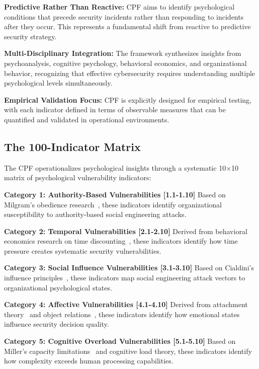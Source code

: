 \documentclass[11pt,a4paper]{article}
\begin{document}
\textbf{Predictive Rather Than Reactive:} CPF aims to identify psychological conditions that precede security incidents rather than responding to incidents after they occur. This represents a fundamental shift from reactive to predictive security strategy.

\textbf{Multi-Disciplinary Integration:} The framework synthesizes insights from psychoanalysis, cognitive psychology, behavioral economics, and organizational behavior, recognizing that effective cybersecurity requires understanding multiple psychological levels simultaneously.

\textbf{Empirical Validation Focus:} CPF is explicitly designed for empirical testing, with each indicator defined in terms of observable measures that can be quantified and validated in operational environments.

\subsection{The 100-Indicator Matrix}

The CPF operationalizes psychological insights through a systematic 10×10 matrix of psychological vulnerability indicators:

\textbf{Category 1: Authority-Based Vulnerabilities [1.1-1.10]} Based on Milgram's obedience research~\cite{milgram1974}, these indicators identify organizational susceptibility to authority-based social engineering attacks.

\textbf{Category 2: Temporal Vulnerabilities [2.1-2.10]} Derived from behavioral economics research on time discounting~\cite{kahneman1979}, these indicators identify how time pressure creates systematic security vulnerabilities.

\textbf{Category 3: Social Influence Vulnerabilities [3.1-3.10]} Based on Cialdini's influence principles~\cite{cialdini2007}, these indicators map social engineering attack vectors to organizational psychological states.

\textbf{Category 4: Affective Vulnerabilities [4.1-4.10]} Derived from attachment theory~\cite{bowlby1969} and object relations~\cite{klein1946}, these indicators identify how emotional states influence security decision quality.

\textbf{Category 5: Cognitive Overload Vulnerabilities [5.1-5.10]} Based on Miller's capacity limitations~\cite{miller1956} and cognitive load theory, these indicators identify how complexity exceeds human processing capabilities.
\end{document}
